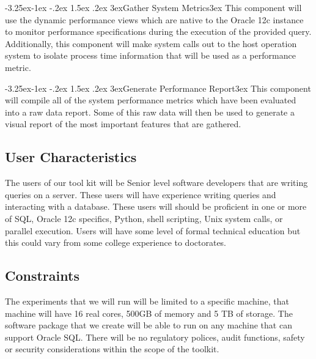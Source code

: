 \documentclass[draftclsnofoot, onecolumn, compsoc, 10pt]{IEEEtran}
\makeatletter
\newcommand\Xsubsubsection{\@startsection{subsubsection}{3}{\z@}%
                                     {-3.25ex\@plus -1ex \@minus -.2ex}%
                                     {1.5ex \@plus .2ex}%
                                     {\normalfont\normalsize\leftskip 3ex}}
\renewcommand\subsubsection[1]{\Xsubsubsection{#1}\leftskip 3ex}
\makeatother
\begin{document}
\subsubsection{Gather System Metrics}
This component will use the dynamic performance views which are native to the Oracle 12c instance to monitor performance specifications during the execution of the provided query. 
Additionally, this component will make system calls out to the host operation system to isolate process time information that will be used as a performance metric. 

\subsubsection{Generate Performance Report}
This component will compile all of the system performance metrics which have been evaluated into a raw data report. Some of this raw data will then be used to generate a visual report of the most important features that are gathered.

\subsection{User Characteristics}
The users of our tool kit will be Senior level software developers that are writing queries on a server.
These users will have experience writing queries and interacting with a database.
These users will should be proficient in one or more of SQL, Oracle 12c specifics, Python, shell scripting, Unix system calls, or parallel execution.
Users will have some level of formal technical education but this could vary from some college experience to doctorates.  

\subsection{Constraints}
The experiments that we will run will be limited to a specific machine, that machine will have 16 real cores, 500GB of memory and 5 TB of storage.
The software package that we create  will be able to run on any machine that can support Oracle SQL.
There will be no regulatory polices, audit functions, safety or security considerations within the scope of the toolkit.
\end{document}
